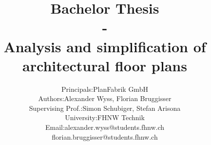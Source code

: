 \documentclass[11pt, a4paper]{report}
\begin{document}
	\title{\textbf{Bachelor Thesis \\ - \\Analysis and simplification of architectural floor plans}}
	\author{
			\begin{tabular}{l  l}
				Principals: & PlanFabrik GmbH \\
				Authors: & Alexander Wyss, Florian Bruggisser \\
				Supervising Prof.: & Simon Schubiger, Stefan Arisona \\ University: & FHNW Technik \\
				Email: & alexander.wyss@students.fhnw.ch \\ & florian.bruggisser@students.fhnw.ch				
			\end{tabular}
	}
	
\maketitle



\tableofcontents
	







	



\clearpage
\printglossary

\clearpage
\listoffigures
\end{document}
